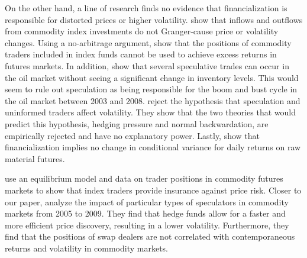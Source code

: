 \documentclass[12pt]{article}
\begin{document}
On the other hand, a line of research finds no evidence that financialization is responsible for distorted prices or higher volatility. \citet*{stoll2010commodity} show that inflows and outflows from commodity index investments do not Granger-cause price or volatility changes. Using a no-arbitrage argument, \citet*{hamilton2014risk} show that the positions of commodity traders included in index funds cannot be used to achieve excess returns in futures markets. In addition, \citet*{kilian2014role} show that several speculative trades can occur in the oil market without seeing a significant change in inventory levels. This would seem to rule out speculation as being responsible for the boom and bust cycle in the oil market between 2003 and 2008. \citet*{bryant2006causality} reject the hypothesis that speculation and uninformed traders affect volatility. They show that the two theories that would predict this hypothesis, hedging pressure and normal backwardation, are empirically rejected and have no explanatory power. Lastly, \citet*{bohl2013does} show that financialization implies no change in conditional variance for daily returns on raw material futures.

\citet*{brunetti2014commodity} use an equilibrium model and data on trader positions in commodity futures markets to show that index traders provide insurance against price risk.   Closer to our paper,  \citet*{brunetti2016speculators}  analyze the impact of particular types of speculators in commodity markets from 2005 to 2009. They find that hedge funds allow for a faster and more efficient price discovery, resulting in a lower volatility. Furthermore, they find that the positions of swap dealers are not correlated with contemporaneous returns and volatility in commodity markets.  


\end{document}
